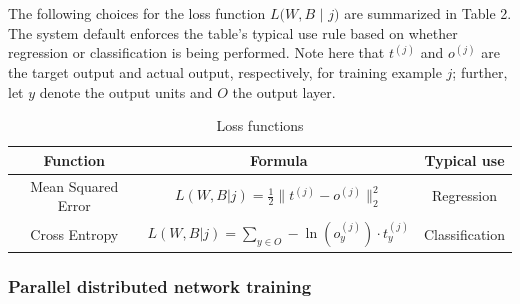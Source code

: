 \documentclass[11pt]{article}
\begin{document}
\\
\\
The following choices for the loss function $L(W,B$ $|$ $ j)$ are summarized in Table 2. The system default enforces the table's typical use rule based on whether regression or classification is being performed. Note here that $t^{(j)}$ and $o^{(j)}$ are the target output and actual output, respectively, for training example $j$; further, let $y$ denote the output units and $O$ the output layer.  
\\
\begin{table}[ht] 
\caption{Loss functions }
\centering %
\begin{tabular}{c c c} %
\hline\hline %
Function & Formula & Typical use \\ [0.5ex] %
\hline %
Mean Squared Error & $L(W,B | j) = \frac{1}{2}\|t^{(j)} - o^{(j)}\|_2^2$ & Regression \\ %
Cross Entropy & $L(W,B | j) = \sum\limits_{y \in O} -\ln(o_y^{(j)}) \cdot t_y^{(j)}$ & Classification \\  
\hline %
\end{tabular} 
\label{table:nonlin} %
\end{table}

\subsubsection{Parallel distributed network training} \label{2.2.3}
\end{document}
